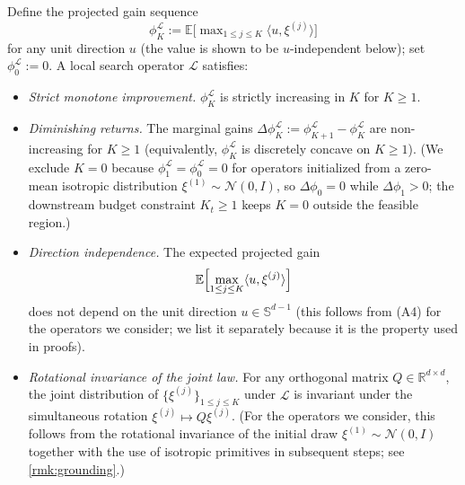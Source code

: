 \begin{assumption}
\label{asm:local-search}
Define the projected gain sequence
\begin{equation}
  \phi_K^{\mathcal{L}} := \mathbb{E}\bigl[\max\nolimits_{1 \le j \le K} \langle u, \xi^{(j)}\rangle\bigr]
  \label{eq:phi-def}
\end{equation}
for any unit direction $u$ (the value is shown to be $u$-independent below); set $\phi_0^{\mathcal L} := 0$. A local search operator $\mathcal{L}$ satisfies:
\begin{itemize}
\item[\textup{(A1)}] \emph{Strict monotone improvement.} $\phi_K^{\mathcal{L}}$ is strictly increasing in $K$ for $K \ge 1$.
\item[\textup{(A2)}] \emph{Diminishing returns.} The marginal gains $\Delta\phi_K^{\mathcal{L}} := \phi_{K+1}^{\mathcal{L}} - \phi_K^{\mathcal{L}}$ are non-increasing for $K \ge 1$ (equivalently, $\phi_K^{\mathcal L}$ is discretely concave on $K \ge 1$). (We exclude $K=0$ because $\phi_1^{\mathcal L}=\phi_0^{\mathcal L}=0$ for operators initialized from a zero-mean isotropic distribution $\xi^{(1)}\sim\mathcal N(0,I)$, so $\Delta\phi_0=0$ while $\Delta\phi_1>0$; the downstream budget constraint $K_t \ge 1$ keeps $K=0$ outside the feasible region.)
\item[\textup{(A3)}] \emph{Direction independence.} The expected projected gain
\[
  \mathbb{E}\Bigl[\max_{1 \le j \le K}\langle u, \xi^{(j)}\rangle\Bigr]
\]
does not depend on the unit direction $u \in \mathbb{S}^{d-1}$ (this follows from (A4) for the operators we consider; we list it separately because it is the property used in proofs).
\item[\textup{(A4)}] \emph{Rotational invariance of the joint law.} For any orthogonal matrix $Q \in \mathbb{R}^{d\times d}$, the joint distribution of $\{\xi^{(j)}\}_{1 \le j \le K}$ under $\mathcal{L}$ is invariant under the simultaneous rotation $\xi^{(j)} \mapsto Q\xi^{(j)}$. (For the operators we consider, this follows from the rotational invariance of the initial draw $\xi^{(1)} \sim \mathcal{N}(0, I)$ together with the use of isotropic primitives in subsequent steps; see \cref{rmk:grounding}.)
\end{itemize}
\end{assumption}
%
